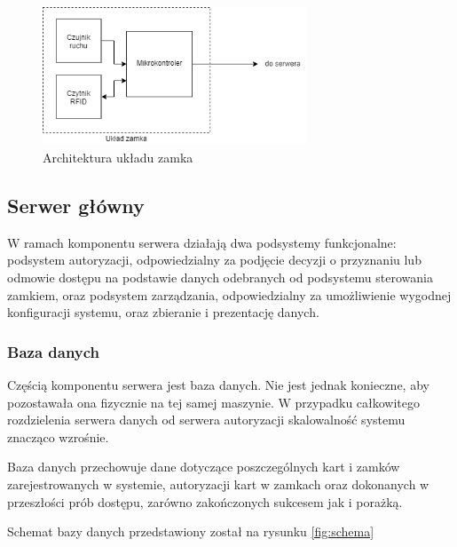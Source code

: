                         \begin{figure}
                                \centering
                                \includegraphics[width=0.7\textwidth]{chapters/images/lock.png}
                                \caption{Architektura układu zamka}
                                \label{fig:lock-arch}
                        \end{figure}

                \subsection{Serwer główny}
                        W ramach komponentu serwera działają dwa podsystemy funkcjonalne: podsystem autoryzacji, odpowiedzialny za podjęcie decyzji o przyznaniu lub odmowie dostępu na podstawie danych odebranych od podsystemu sterowania zamkiem, oraz podsystem zarządzania, odpowiedzialny za umożliwienie wygodnej konfiguracji systemu, oraz zbieranie i prezentację danych.

                        \subsubsection{Baza danych}
                                Częścią komponentu serwera jest baza danych. Nie jest jednak konieczne, aby pozostawała ona fizycznie na tej samej maszynie. W przypadku całkowitego rozdzielenia serwera danych od serwera autoryzacji skalowalność systemu znacząco wzrośnie.

                                Baza danych przechowuje dane dotyczące poszczególnych kart i zamków zarejestrowanych w systemie, autoryzacji kart w zamkach oraz dokonanych w przeszłości prób dostępu, zarówno zakończonych sukcesem jak i porażką.

                                Schemat bazy danych przedstawiony został na rysunku \ref{fig:schema}


